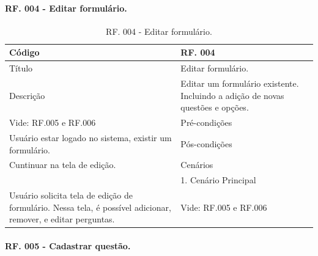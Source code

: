 \documentclass[11pt]{article}
\begin{document}
  \newpage
  
      \paragraph{RF. 004 - Editar formulário.} \hspace{10pt}

      \begin{table}[h]
        \begin{center}
          \begin{tabular}{ | p{5cm} | p{10cm} | }
            \hline
            Código\cellcolor{gray} & RF. 004\cellcolor{gray} \\
            \hline
            Título & Editar formulário. \\
            \hline
            Descrição & Editar um formulário existente. Incluindo a adição de novas questões e opções. \\
            \hline
            Vide: RF.005 e RF.006 & Pré-condições \\
            \hline
            Usuário estar logado no sistema, existir um formulário. & Pós-condições \\
            \hline
            Cuntinuar na tela de edição. & Cenários \\
            \hline
              & 1.  Cenário Principal \\
            \hline
            Usuário solicita tela de edição de formulário. Nessa tela, é possível adicionar, remover, e editar perguntas. & Vide: RF.005 e RF.006 \\
            \hline
          \end{tabular}
          \caption{RF. 004 - Editar formulário.}
        \end{center}
      \end{table}

      \paragraph{RF. 005 - Cadastrar questão.} \hspace{10pt}
\end{document}
